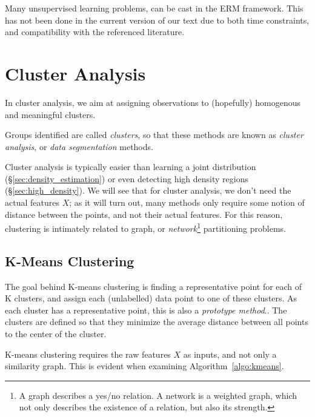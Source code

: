 \begin{remark}
Many unsupervised learning problems, can be cast in the ERM framework.
This has not been done in the current version of our text due to both time constraints, and compatibility with the referenced literature.
\end{remark}








\section{Cluster Analysis}
\label{sec:cluster_analysis}

In cluster analysis, we aim at assigning observations to (hopefully) homogenous and meaningful clusters. 

Groups identified are called \emph{clusters}, so that these methods are known as \emph{cluster analysis}, or \emph{data segmentation} methods.

Cluster analysis is typically easier than learning a joint distribution (\S\ref{sec:density_estimation}) or even detecting high density regions (\S\ref{sec:high_density}). 
We will see that for cluster analysis, we don't need the actual features $X$; as it will turn out, many methods only require some notion of distance between the points, and not their actual features. 
For this reason, clustering is intimately related to graph, or \emph{network}\footnote{A graph describes a yes/no relation. A network is a weighted graph, which not only describes the existence of a relation, but also its strength.} partitioning problems.



\subsection{K-Means Clustering}
\label{sec:kmeans}
The goal behind K-means clustering is finding a representative point for each of K clusters, and assign each (unlabelled) data point to one of these clusters. As each cluster has a representative point, this is also a \emph{prototype method}..
The clusters are defined so that they minimize the average distance between all points to the center of the cluster.

K-means clustering requires the raw features $X$ as inputs, and not only a similarity graph. This is evident when examining Algorithm~\ref{algo:kmeans}.

